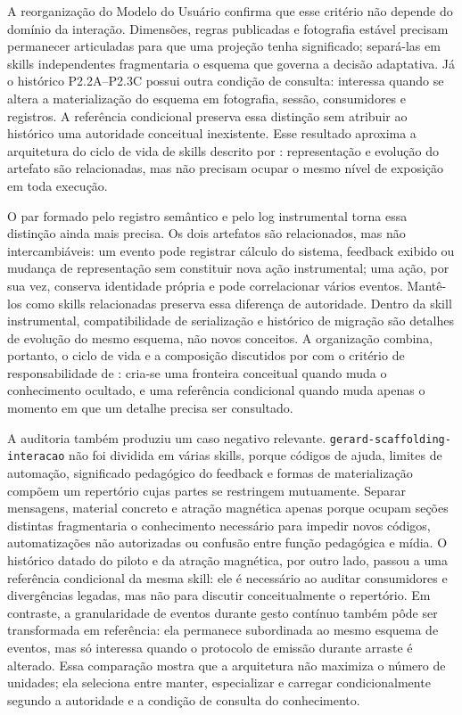\documentclass[preprint,12pt,authoryear]{elsarticle}
\begin{document}
A reorganização do Modelo do Usuário confirma que esse critério não depende do domínio da interação. Dimensões, regras publicadas e fotografia estável precisam permanecer articuladas para que uma projeção tenha significado; separá-las em skills independentes fragmentaria o esquema que governa a decisão adaptativa. Já o histórico P2.2A--P2.3C possui outra condição de consulta: interessa quando se altera a materialização do esquema em fotografia, sessão, consumidores e registros. A referência condicional preserva essa distinção sem atribuir ao histórico uma autoridade conceitual inexistente. Esse resultado aproxima a arquitetura do ciclo de vida de skills descrito por \citet{badhe2026survey}: representação e evolução do artefato são relacionadas, mas não precisam ocupar o mesmo nível de exposição em toda execução.

O par formado pelo registro semântico e pelo log instrumental torna essa distinção ainda mais precisa. Os dois artefatos são relacionados, mas não intercambiáveis: um evento pode registrar cálculo do sistema, feedback exibido ou mudança de representação sem constituir nova ação instrumental; uma ação, por sua vez, conserva identidade própria e pode correlacionar vários eventos. Mantê-los como skills relacionadas preserva essa diferença de autoridade. Dentro da skill instrumental, compatibilidade de serialização e histórico de migração são detalhes de evolução do mesmo esquema, não novos conceitos. A organização combina, portanto, o ciclo de vida e a composição discutidos por \citet{badhe2026survey} com o critério de responsabilidade de \citet{parnas1972criteria}: cria-se uma fronteira conceitual quando muda o conhecimento ocultado, e uma referência condicional quando muda apenas o momento em que um detalhe precisa ser consultado.

A auditoria também produziu um caso negativo relevante. \texttt{gerard-scaffolding-interacao} não foi dividida em várias skills, porque códigos de ajuda, limites de automação, significado pedagógico do feedback e formas de materialização compõem um repertório cujas partes se restringem mutuamente. Separar mensagens, material concreto e atração magnética apenas porque ocupam seções distintas fragmentaria o conhecimento necessário para impedir novos códigos, automatizações não autorizadas ou confusão entre função pedagógica e mídia. O histórico datado do piloto e da atração magnética, por outro lado, passou a uma referência condicional da mesma skill: ele é necessário ao auditar consumidores e divergências legadas, mas não para discutir conceitualmente o repertório. Em contraste, a granularidade de eventos durante gesto contínuo também pôde ser transformada em referência: ela permanece subordinada ao mesmo esquema de eventos, mas só interessa quando o protocolo de emissão durante arraste é alterado. Essa comparação mostra que a arquitetura não maximiza o número de unidades; ela seleciona entre manter, especializar e carregar condicionalmente segundo a autoridade e a condição de consulta do conhecimento.
\end{document}
